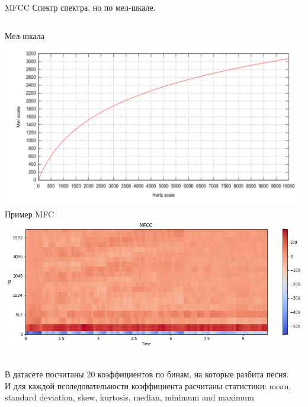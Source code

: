 \documentclass[c, aspectratio = 43]{beamer}
\begin{document}
\begin{frame}{MFCC}
\centering
Спектр спектра, но по мел-шкале.\\


\begin{columns}
    Мел-шкала
    \includegraphics[width=\linewidth]{mfcc.png}
    Пример MFC
    \includegraphics[width=\linewidth]{mfcc2.png}
    
\end{columns}

В датасете посчитаны 20 коэффициентов по бинам, на которые разбита песня.\\
И для каждой псоледовательности коэффициента расчитаны статистики:  mean, standard deviation, skew, kurtosis, median, minimum and maximum
\end{frame}
\end{document}
